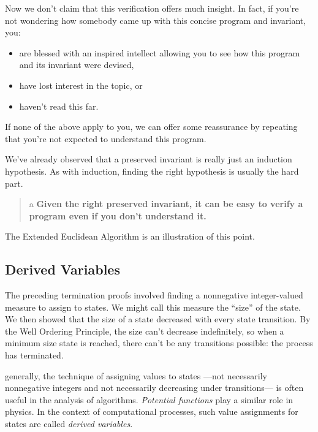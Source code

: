 Now we don't claim that this verification offers much insight.  In fact,
if you're not wondering how somebody came up with this concise program and
invariant, you:
\begin{itemize}

\item are blessed with an inspired intellect allowing you to see how this
  program and its invariant were devised,

\item have lost interest in the topic, or

\item haven't read this far.

\end{itemize}
If none of the above apply to you, we can offer some reassurance by
repeating that you're not expected to understand this program.

We've already observed that a preserved invariant is really just an
induction hypothesis.  As with induction, finding the right hypothesis
is usually the hard part.
\begin{quote}
a  \textbf{Given the right preserved invariant, it can be easy to verify a
    program even if you don't understand it.}
\end{quote}
The Extended Euclidean Algorithm is an illustration of this point.

\subsection{Derived Variables}

The preceding termination proofs involved finding a nonnegative
integer-valued measure to assign to states.  We might call this measure
the ``size'' of the state.  We then showed that the size of a state
decreased with every state transition.  By the Well Ordering Principle,
the size can't decrease indefinitely, so when a minimum size state is
reached, there can't be any transitions possible: the process has
terminated.

 generally, the technique of assigning
values to states ---not necessarily nonnegative integers and not necessarily
decreasing under transitions--- is often useful in the analysis of
algorithms.  \emph{Potential functions} play a similar role in physics.
In the context of computational processes, such value assignments for
states are called \emph{derived variables}.

